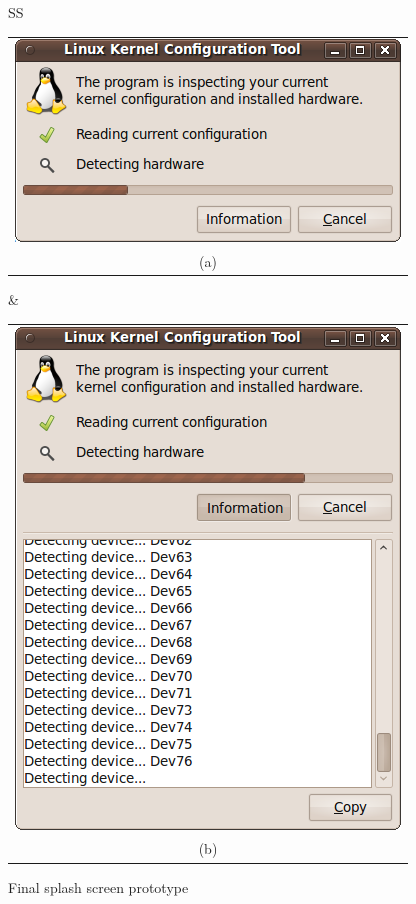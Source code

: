 \documentclass{chi2009}
\begin{document}
\begin{figure}[!t]
 \centering
\begin{tabular}{SS}
 \begin{tabular}{c}
  \includegraphics[scale=0.5,keepaspectratio=true]{figs/splash-final1} \\
  (a) \\
 \end{tabular}
  & 
\begin{tabular}{c}
  \includegraphics[scale=0.5,keepaspectratio=true]{figs/splash-final2} \\
  (b) \\
 \end{tabular}
\end{tabular}
\caption{Final splash screen prototype}
\label{fig:splash-final}
\end{figure}
\end{document}
